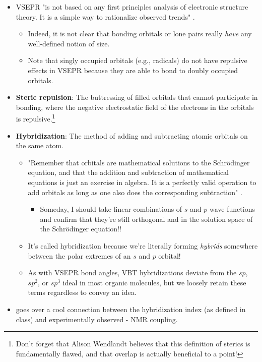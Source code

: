 \documentclass[../notes.tex]{subfiles}
\begin{document}
\begin{itemize}
    \item VSEPR "is not based on any first principles analysis of electronic structure theory. It is a simple way to rationalize observed trends" \parencite[8]{bib:Anslyn}.
    \begin{itemize}
        \item Indeed, it is not clear that bonding orbitals or lone pairs really \emph{have} any well-defined notion of size.
        \item Note that singly occupied orbitals (e.g., radicals) do not have repulsive effects in VSEPR because they are able to bond to doubly occupied orbitals.
    \end{itemize}
    \item \textbf{Steric repulsion}: The buttressing of filled orbitals that cannot participate in bonding, where the negative electrostatic field of the electrons in the orbitals is repulsive.\footnote{Don't forget that Alison Wendlandt believes that this definition of sterics is fundamentally flawed, and that overlap is actually beneficial to a point!}
    \item \textbf{Hybridization}: The method of adding and subtracting atomic orbitals on the same atom.
    \begin{itemize}
        \item "Remember that orbitals are mathematical solutions to the Schr\"{o}dinger equation, and that the addition and subtraction of mathematical equations is just an exercise in algebra. It is a perfectly valid operation to add orbitals as long as one also does the corresponding subtraction" \parencite[9]{bib:Anslyn}.
        \begin{itemize}
            \item Someday, I should take linear combinations of $s$ and $p$ wave functions and confirm that they're still orthogonal and in the solution space of the Schr\"{o}dinger equation!!
        \end{itemize}
        \item It's called hybridization because we're literally forming \emph{hybrids} somewhere between the polar extremes of an $s$ and $p$ orbital!
        \item As with VSEPR bond angles, VBT hybridizations deviate from the $sp$, $sp^2$, or $sp^3$ ideal in most organic molecules, but we loosely retain these terms regardless to convey an idea.
    \end{itemize}
    \item \textcite{bib:Anslyn} goes over a cool connection between the hybridization index (as defined in class) and experimentally observed - NMR coupling.

\end{itemize}
\end{document}

